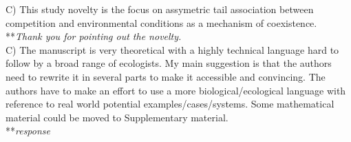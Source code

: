 \documentclass[letterpaper,11pt]{article}
\begin{document}
\noindent C) This study novelty is the focus on assymetric tail association between competition and environmental conditions as a mechanism of coexistence. \\

\noindent ***\emph{Thank you for pointing out the novelty.} \\

\noindent C) The manuscript is very theoretical with a highly technical language hard to follow by a broad range of ecologists. My main suggestion is that the authors need to rewrite it in several parts to make it accessible and convincing. The authors have to make an effort to use a more biological/ecological language with reference to real world potential examples/cases/systems. Some mathematical material could be moved to Supplementary material. \\

\noindent ***\emph{response} \\
\end{document}
